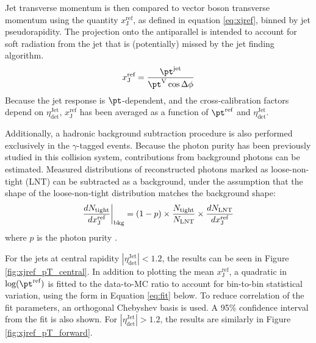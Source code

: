 \documentclass[NOTE, atlasdraft=true, texlive=2016, USenglish]{\ATLASLATEXPATH atlasdoc}
\begin{document}
Jet transverse momentum is then compared to vector boson transverse momentum using the quantity $x_{\text{J}}^{\text{ref}}$, as defined in equation \ref{eq:xjref}, binned by jet pseudorapidity. The projection onto the antiparallel is intended to account for soft radiation from the jet that is (potentially) missed by the jet finding algorithm.
\begin{equation}
	x_{\text{J}}^{\text{ref}} = \frac{\pt^{\text{jet}}}{\pt^{\text{V}} \cos{\Delta\phi}}
	\label{eq:xjref}
\end{equation}
Because the jet response is $\pt$-dependent, and the cross-calibration factors depend on $\eta_{\text{det}}^{\text{Jet}}$, $x_{\text{J}}^{\text{ref}}$ has been averaged as a function of $\pt^{\text{ref}}$ and $\eta_{\text{det}}^{\text{Jet}}$. 

Additionally, a hadronic background subtraction procedure is also performed exclusively in the $\gamma$-tagged events. Because the photon purity has been previously studied in this collision system, contributions from background photons can be estimated. Measured distributions of reconstructed photons marked as loose-non-tight (LNT) can be subtracted as a background, under the assumption that the shape of the loose-non-tight distribution matches the background shape:
\begin{equation}
	\frac{dN_{\text{tight}}}{dx^{\text{ref}}_{\text{J}}}\bigg{|}_{\text{bkg}} = (1 - p) \times \frac{N_{\text{tight}}}{N_{\text{LNT}}} \times \frac{dN_{\text{LNT}}}{dx^{\text{ref}}_{\text{J}}}
	\label{eq:bkg}
\end{equation}
 where $p$ is the photon purity \cite{ATL-COM-PHYS-2017-999}.
 
%

For the jets at central rapidity $\left|\eta_{\text{det}}^{\text{Jet}}\right| < 1.2$, the results can be seen in Figure \ref{fig:xjref_pT_central}. In addition to plotting the mean $x_{\text{J}}^{\text{ref}}$, a quadratic in $\text{log}(\pt^{\text{ref}})$ is fitted to the data-to-MC ratio to account for bin-to-bin statistical variation, using the form in Equation \ref{eq:fit} below. To reduce correlation of the fit parameters, an orthogonal Chebyshev basis is used. A 95\% confidence interval from the fit is also shown. For $\left|\eta_{\text{det}}^{\text{Jet}}\right| > 1.2$, the results are similarly in Figure \ref{fig:xjref_pT_forward}.
\end{document}
